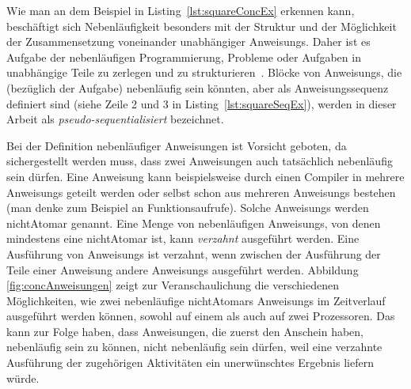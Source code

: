 Wie man an dem Beispiel in Listing~\ref{lst:squareConcEx} erkennen kann, beschäftigt sich Nebenläufigkeit besonders mit der Struktur und der Möglichkeit der Zusammensetzung voneinander unabhängiger \glspl{Anweisung}. Daher ist es Aufgabe der nebenläufigen Programmierung, Probleme oder Aufgaben in unabhängige Teile zu zerlegen und zu strukturieren~\cite{Pike2012,Hettel2016}. Blöcke von \glspl{Anweisung}, die (bezüglich der Aufgabe) nebenläufig sein könnten, aber als Anweisungssequenz definiert sind (siehe Zeile 2 und 3 in Listing~\ref{lst:squareSeqEx}), werden in dieser Arbeit als \emph{pseudo-sequentialisiert} bezeichnet.

Bei der Definition nebenläufiger Anweisungen ist Vorsicht geboten, da sichergestellt werden muss, dass zwei Anweisungen auch tatsächlich nebenläufig sein dürfen. Eine \gls{Anweisung} kann beispielsweise durch einen Compiler in mehrere \glspl{Anweisung} geteilt werden oder selbst schon aus mehreren \glspl{Anweisung} bestehen (man denke zum Beispiel an Funktionsaufrufe). Solche \glspl{Anweisung} werden \gls{nichtAtomar} genannt. Eine Menge von nebenläufigen \glspl{Anweisung}, von denen mindestens eine \gls{nichtAtomar} ist, kann \emph{verzahnt} ausgeführt werden. Eine Ausführung von \glspl{Anweisung} ist verzahnt, wenn zwischen der Ausführung der Teile einer  \gls{Anweisung} andere \glspl{Anweisung} ausgeführt werden. Abbildung \ref{fig:concAnweisungen} zeigt zur Veranschaulichung die verschiedenen Möglichkeiten, wie zwei nebenläufige \glspl{nichtAtomar} \glspl{Anweisung} im Zeitverlauf ausgeführt werden können, sowohl auf einem als auch auf zwei Prozessoren. Das kann zur Folge haben, dass Anweisungen, die zuerst den Anschein haben, nebenläufig sein zu können, nicht nebenläufig sein dürfen, weil eine verzahnte Ausführung der zugehörigen Aktivitäten ein unerwünschtes Ergebnis liefern würde. 


